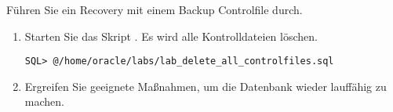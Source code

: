    \item F\"uhren Sie ein Recovery mit einem Backup Controlfile durch.
      \begin{enumerate}
        \item Starten Sie das Skript . Es wird alle Kontrolldateien l\"oschen.
          \begin{lstlisting}[language=terminal]
SQL> @/home/oracle/labs/lab_delete_all_controlfiles.sql
          \end{lstlisting}
        \item Ergreifen Sie geeignete Ma\ss{}nahmen, um die Datenbank wieder lauff\"ahig zu machen.
      \end{enumerate}
